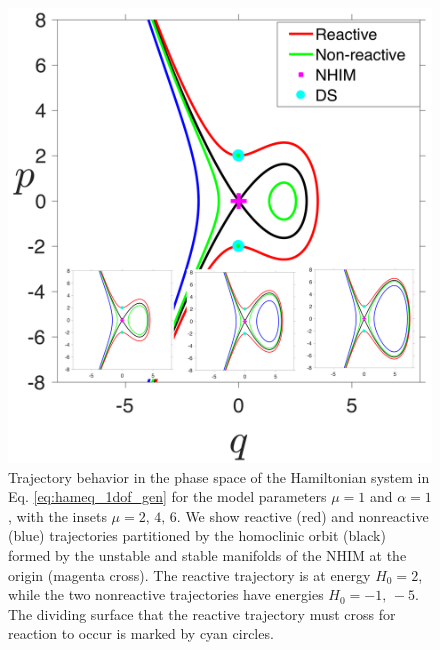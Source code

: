 \documentclass[8pt]{article}
\begin{document}
\begin{figure}[htbp]
	\begin{center}
		\includegraphics[scale=0.11]{fig5.png}
	\end{center}
	\caption{Trajectory behavior in the phase space of the Hamiltonian system in Eq. \eqref{eq:hameq_1dof_gen} for the model parameters $\mu = 1$ and $\alpha = 1$, with the insets $\mu = 2,\, 4, \, 6$. We show reactive (red) and nonreactive (blue) trajectories partitioned by the homoclinic orbit (black) formed by the unstable and stable manifolds of the NHIM at the origin (magenta cross). The reactive trajectory is at energy $H_0 = 2$, while the two nonreactive trajectories have energies $H_0 = -1, \, -5$. The dividing surface that the reactive trajectory must cross for reaction to occur is marked by cyan circles.}
	\label{fig:dynbeh_1DoF}
\end{figure}



\end{document}

